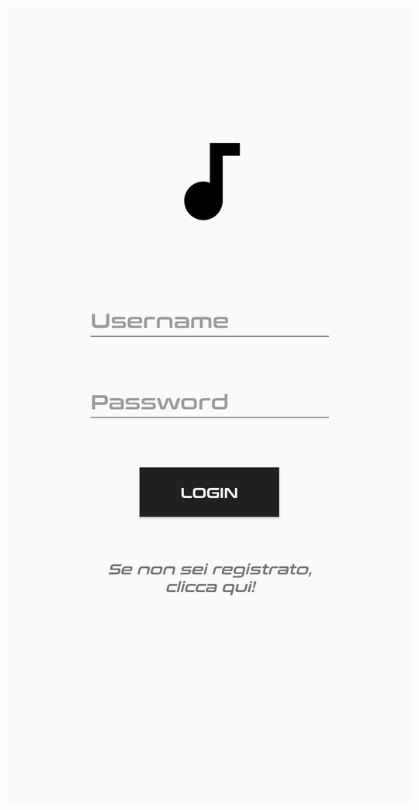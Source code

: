 \documentclass{article}
\begin{document}
\begin{minipage}[t]{0.35\textwidth}
    \centering
    \vspace*{0pt}
    \includegraphics[width=0.8\textwidth]{login.png}\vspace*{40pt}
\end{minipage}
\end{document}
